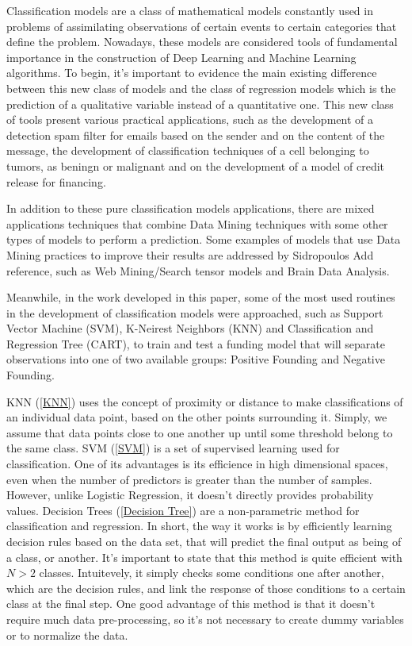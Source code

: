 \documentclass[conference]{IEEEtran}
\newcommand{\reviewNormal}[1]{{\color{yellow} #1}} %
\begin{document}
Classification models are a class of mathematical models constantly used in problems of
assimilating observations of certain events to certain categories that define the problem.
Nowadays, these models are considered tools of fundamental importance in the construction 
of Deep Learning and Machine Learning algorithms. To begin, it's important to evidence 
the main existing difference between this new class of models and the class of 
regression models which is the prediction of a qualitative variable instead of a quantitative
one. This new class of tools present various practical applications, such as the 
development of a detection spam filter for emails based on the sender and on the content
of the message, the development of classification techniques of a cell belonging to tumors, 
as beningn or malignant and on the development of a model of credit release for financing.

In addition to these pure classification models applications, there are mixed applications 
techniques that combine Data Mining techniques with some other types of models to perform
a prediction. Some examples of models that use Data Mining practices to improve their 
results are addressed by Sidropoulos \reviewNormal{Add reference}, such as Web Mining/Search 
tensor models and Brain Data Analysis. 

Meanwhile, in the work developed in this paper, some of the most used routines in the
development of classification models were approached, such as Support Vector Machine (SVM),
K-Neirest Neighbors (KNN) \cite{Patrick} and Classification and Regression Tree (CART), to train and 
test a funding model that will separate observations into one of two available groups:
Positive Founding and Negative Founding.

KNN (\ref{KNN}) uses the concept of proximity or distance to make 
classifications of an individual data point, based on the other points surrounding it. Simply,
we assume that data points close to one another up until some threshold belong to the same class.
SVM (\ref{SVM}) is a set of supervised learning used for classification. One of its
advantages is its efficience in high dimensional spaces, even when the number of 
predictors is greater than the number of samples. However, unlike Logistic Regression,
it doesn't directly provides probability values. Decision Trees (\ref{Decision Tree})
are a non-parametric method for classification and regression. In short, the way it 
works is by efficiently learning decision rules based on the data set, that will
predict the final output as being of a class, or another. It's important to state 
that this method is quite efficient with $N>2$ classes. Intuitevely, it simply checks 
some conditions one after another, which are the decision rules, and link the response of those 
conditions to a certain class at the final step. One good advantage of this method is that it 
doesn't require much data pre-processing, so it's not necessary to create dummy variables or 
to normalize the data.  
\end{document}
